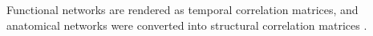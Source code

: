 Functional networks are rendered as temporal correlation matrices, and anatomical networks were converted into structural correlation matrices \cite{Puxeddu2022}.